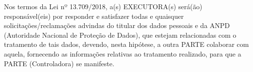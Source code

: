 \xx Nos termos da Lei nº 13.709/2018, a(s) EXECUTORA(s) será(ão) responsável(eis) por responder e satisfazer todas e quaisquer solicitações/reclamações advindas do titular dos dados pessoais e da ANPD (Autoridade Nacional de Proteção de Dados), que estejam relacionadas com o tratamento de tais dados, devendo, nesta hipótese, a outra PARTE colaborar com aquela, fornecendo as informações relativas ao tratamento realizado, para que a PARTE (Controladora) se manifeste.
